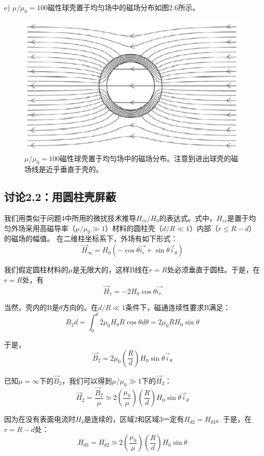 e) $\mu/\mu_0=100$磁性球壳置于均匀场中的磁场分布如图2.6所示。

\begin{figure}
  \centering
 \includegraphics[scale=0.7]{chpt2/figs/fig2.6.eps}
  \caption{$\mu/\mu_0=100$磁性球壳置于均匀场中的磁场分布。注意到进出球壳的磁场线是近乎垂直于壳的。}
\end{figure}

\subsection{讨论2.2：用圆柱壳屏蔽}
我们用类似于问题4中所用的微扰技术推导$H_{cs}/H_0$的表达式。式中，$H_{cs}$是置于均匀外场采用高磁导率（$\mu/\mu_0 \gg 1$）材料的圆柱壳（$d/R\ll 1$）内部（$r\le R-d$）的磁场的幅值。
在二维柱坐标系下，外场有如下形式：
$$
\vec{H}_\infty =H_0 (-\cos\theta \vec{i_r}+\sin\theta\vec{i}_\theta)
$$

我们假定圆柱材料的$\mu$是无限大的，这样B线在$r=R$处必须垂直于圆柱。于是，在$r=R$处，有
$$\vec{H}_1 =-2 H_0 \cos\theta \vec{i_r}$$

当然，壳内的B是$\theta$方向的。在$d/R\ll 1$条件下，磁通连续性要求B满足：
$$B_2 d=\int_{0}^{\theta}2\mu_0 H_0 R\cos\theta d\theta=2\mu_0 R H_0 \sin\theta$$

于是，
$$\vec{B}_2=2\mu_0 (\frac{R}{d})H_0 \sin\theta \vec{i}_\theta$$

已知$\mu=\infty$下的$\vec{B}_2$，我们可以得到$\mu/\mu_0 \gg 1$下的$\vec{H}_2$：
$$\vec{H}_2= \frac{\vec{B}_2}{\mu}\simeq 2(\frac{\mu_0}{\mu}) (\frac{R}{d})H_0 \sin\theta \vec{i}_\theta$$

因为在没有表面电流时$H_\theta$是连续的，区域2和区域3一定有$H_{\theta 2}=H_{\theta 3}$。于是，在$r=R-d$处：
$$H_{\theta 3}=H_{\theta 2}\simeq 2(\frac{\mu_0}{\mu}) (\frac{R}{d})H_0 \sin\theta$$

